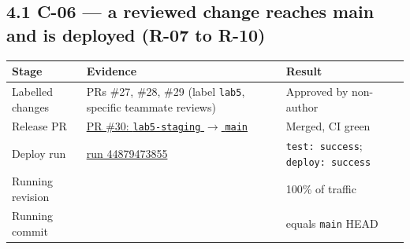 \documentclass[11pt,a4paper]{article}
\begin{document}
\subsection*{4.1 C-06 --- a reviewed change reaches main and is deployed (R-07 to R-10)}
\begin{longtable}{@{}L{3.0cm}L{8.5cm}L{4.7cm}@{}}
\toprule
\textbf{Stage} & \textbf{Evidence} & \textbf{Result} \\
\midrule
Labelled changes & PRs \#27, \#28, \#29 (label \texttt{lab5}, specific teammate reviews) & Approved by non-author \\
Release PR & \href{https://github.com/ssiriwan/cpe334-approval-system/pull/30}{PR \#30: \texttt{lab5-staging} $\to$ \texttt{main}} & Merged, CI green \\
Deploy run & \href{https://github.com/ssiriwan/cpe334-approval-system/actions/runs/44879473855}{run 44879473855} & \texttt{test: success}; \texttt{deploy: success} \\
Running revision &  & 100\% of traffic \\
Running commit &  & equals \texttt{main} HEAD \\
\bottomrule
\end{longtable}

\clearpage
{}
\end{document}
